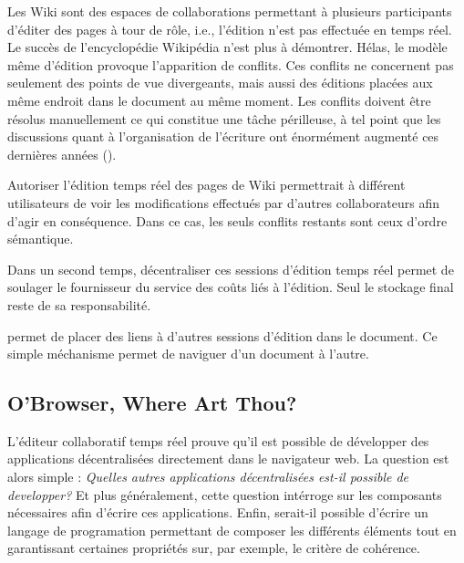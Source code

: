 Les Wiki sont des espaces de collaborations permettant à plusieurs participants
d'éditer des pages à tour de rôle, i.e., l'édition n'est pas effectuée en temps
réel. Le succès de l'encyclopédie Wikipédia n'est plus à démontrer. Hélas, le
modèle même d'édition provoque l'apparition de conflits. Ces conflits ne
concernent pas seulement des points de vue divergeants, mais aussi des éditions
placées aux même endroit dans le document au même moment. Les conflits doivent
être résolus manuellement ce qui constitue une tâche périlleuse, à tel point que
les discussions quant à l'organisation de l'écriture ont énormément augmenté ces
dernières années (\REF). 

Autoriser l'édition temps réel des pages de Wiki permettrait à différent
utilisateurs de voir les modifications effectués par d'autres collaborateurs
afin d'agir en conséquence. Dans ce cas, les seuls conflits restants sont ceux
d'ordre sémantique. 

Dans un second temps, décentraliser ces sessions d'édition temps réel permet de
soulager le fournisseur du service des coûts liés à l'édition. Seul le stockage
final reste de sa responsabilité.  

\CRATE permet de placer des liens à d'autres sessions d'édition dans le
document. Ce simple méchanisme permet de naviguer d'un document à
l'autre. 


\subsection{O'Browser, Where Art Thou?}

L'éditeur collaboratif temps réel prouve qu'il est possible de développer des
applications décentralisées directement dans le navigateur web. La question est
alors simple : \emph{Quelles autres applications décentralisées est-il possible
  de developper?} Et plus généralement, cette question intérroge sur les
composants nécessaires afin d'écrire ces applications. Enfin, serait-il possible
d'écrire un langage de programation permettant de composer les différents
éléments tout en garantissant certaines propriétés sur, par exemple, le critère
de cohérence. 

